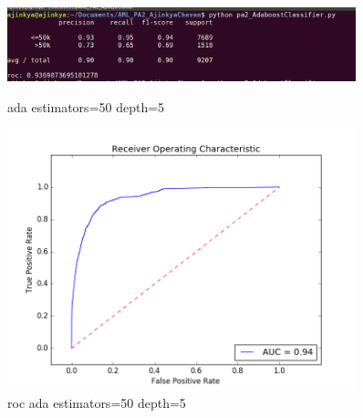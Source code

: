 \documentclass{article}
\begin{document}
\begin{figure}
    \centering
    \begin{minipage}{0.45\textwidth}
        \centering
        \includegraphics[width=0.9\textwidth]{ada_50_5.png} %
        \caption{ada estimators=50 depth=5}
    \end{minipage}\hfill
    \begin{minipage}{0.45\textwidth}
        \centering
        \includegraphics[width=0.9\textwidth]{roc_ada_50_5.png} %
        \caption{roc ada estimators=50 depth=5}
    \end{minipage}
\end{figure}
\end{document}

